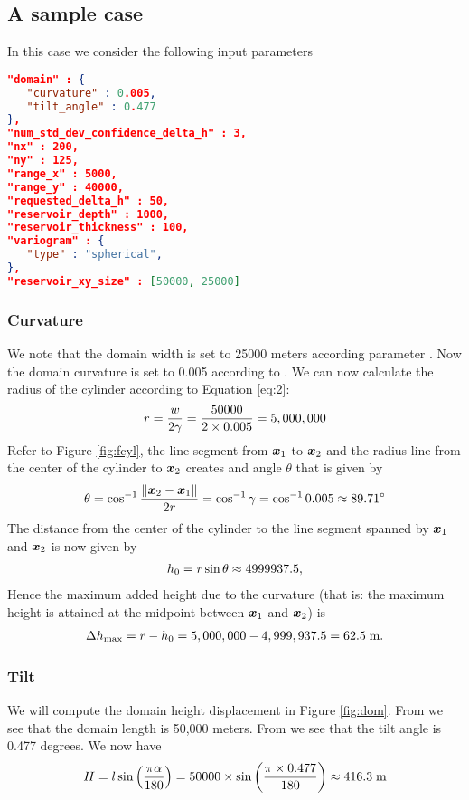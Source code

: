 \documentclass[11pt,a4paper]{amsart}
\begin{document}
\subsection{A sample case}
In this case we consider the following input parameters
\begin{lstlisting}[language=json,firstnumber=1]
"domain" : {
   "curvature" : 0.005,
   "tilt_angle" : 0.477
},
"num_std_dev_confidence_delta_h" : 3,
"nx" : 200,
"ny" : 125,
"range_x" : 5000,
"range_y" : 40000,
"requested_delta_h" : 50,
"reservoir_depth" : 1000,
"reservoir_thickness" : 100,
"variogram" : {
   "type" : "spherical",
},
"reservoir_xy_size" : [50000, 25000]
\end{lstlisting}
\subsubsection{Curvature}
We note that the domain width \domainWidth{} is set to 25000 meters according
parameter . Now the domain curvature
\domainCurvature{} is set to 0.005 according to
. We can now calculate the radius of the
cylinder according to Equation \eqref{eq:2}:
\begin{align}
  \label{eq:5}
  r = \frac{w}{2\gamma} = 
   \frac{50000}{2\times 0.005} = 5,000,000
\end{align}
Refer to Figure \ref{fig:fcyl}, the line segment from $\boldsymbol{x}_1$ to
$\boldsymbol{x}_2$ and the radius line from the 
center of the cylinder to $\boldsymbol{x}_2$ creates and angle $\theta$ that is given
by
\begin{align}
  \label{eq:6}
  \theta = \cos^{-1} \frac{\|\boldsymbol{x}_2 - \boldsymbol{x}_1\|}{2r} = \cos^{-1}
  \gamma = \cos^{-1} 0.005 \approx 89.71^{\circ}
\end{align}
The distance from the center of the cylinder to the line segment spanned by
$\boldsymbol{x}_1$ and $\boldsymbol{x}_2$ is now given by
\begin{align}
  \label{eq:7}
  h_0 = r \sin \theta \approx 4999937.5,
\end{align}
Hence the maximum added height due to the curvature (that is: the maximum
height is attained at the midpoint
between $\boldsymbol{x}_1$ and $\boldsymbol{x}_2$) is
\begin{align}
  \label{eq:9}
  \Delta h_{\text{max}} = r - h_0 = 5,000,000 - 4,999,937.5 =
  62.5 \;\text{m}.
\end{align}
\subsubsection{Tilt}
We will compute the domain height displacement \domainAngleHeight{} in
 Figure \ref{fig:dom}. From  we see that the
 domain length \domainLength{} is 50,000 meters. From
  we see that the tilt angle \tiltAngle{} is
 0.477 degrees. We now have 
\begin{align}
  \label{eq:4}
  H = l \sin
  \left(
  \frac{\pi\alpha}{180}
  \right) = 50000 \times \sin 
  \left(
  \frac{\pi \times 0.477}{180}
  \right) \approx 416.3 \; \text{m} 
\end{align}
\end{document}
